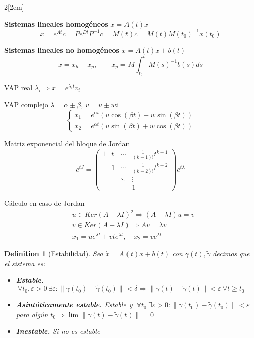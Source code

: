 \documentclass[leqno]{article}
\newtheorem*{definition}{Definition}
\begin{document}
\begin{multicols}{2}[\columnsep2em]

\textbf{Sistemas lineales homogéneos} $\dot{x}=A(t)x$ 
\[
x = e^{At}c = Pe^{Dt}P^{-1}c = M(t)c = M(t)M(t_0)^{-1}x(t_0)
\] 

\textbf{Sistemas lineales no homogéneos} $\dot{x}=A(t)x + b(t)$ 
\[
x = x_h + x_p, \qquad x_p = M\int_{t_0}^t M(s)^{-1}b(s)ds
\] 

VAP real $\lambda_i \Rightarrow x = e^{\lambda_i t}v_i$

VAP complejo $\lambda = \alpha \pm \beta, \ v = u\pm wi$
\[
\begin{cases}
  x_1 = e^{\alpha t}(u\cos(\beta t)-w\sin(\beta t))\\
  x_2 = e^{\alpha t}(u\sin(\beta t)+w\cos(\beta t))
\end{cases}
\] 

Matriz exponencial del bloque de Jordan
\[
  e^{tJ} = \begin{pmatrix} 1 & t & \cdots & \frac{1}{(k-1)!}t^{k-1} \\ & 1 & \cdots & \frac{1}{(k-2)!}t^{k-2} \\ & & \ddots & \vdots \\ & & & 1  \end{pmatrix}  e^{t\lambda}
\] 

Cálculo en caso de Jordan
\begin{align*}
  &u \in Ker(A-\lambda I)^2 \Rightarrow (A-\lambda I)u = v\\
  &v \in Ker(A-\lambda I) \Rightarrow Av = \lambda v\\
  &x_1 = ue^{\lambda t} + vte^{\lambda t}, \quad x_2 = ve^{\lambda t}
\end{align*}

\begin{definition}[Estabilidad] Sea $\dot{x}=A(t)x+b(t)$ con $\gamma(t), \tilde{\gamma}$ decimos que el sistema es:
  \begin{itemize}[topsep=-6pt, itemsep=0pt]
    \item \textbf{Estable.} $\ \forall t_0, \varepsilon >0 \ \exists \varepsilon : \|\gamma(t_0)-\tilde{\gamma}(t_0)\|<\delta \Rightarrow \|\gamma(t)-\tilde{\gamma}(t)\|<\varepsilon \ \forall t\ge t_0$
 \item \textbf{Asintóticamente estable.} Estable y $\ \forall t_0 \ \exists \varepsilon >0: \|\gamma(t_0)-\tilde{\gamma}(t_0)\|<\varepsilon$ para algún $t_0 \Rightarrow \lim \|\gamma(t)-\tilde{\gamma}(t)\| =0$
   \item \textbf{Inestable.} Si no es estable
  \end{itemize}
\end{definition}


\end{multicols}
\end{document}
